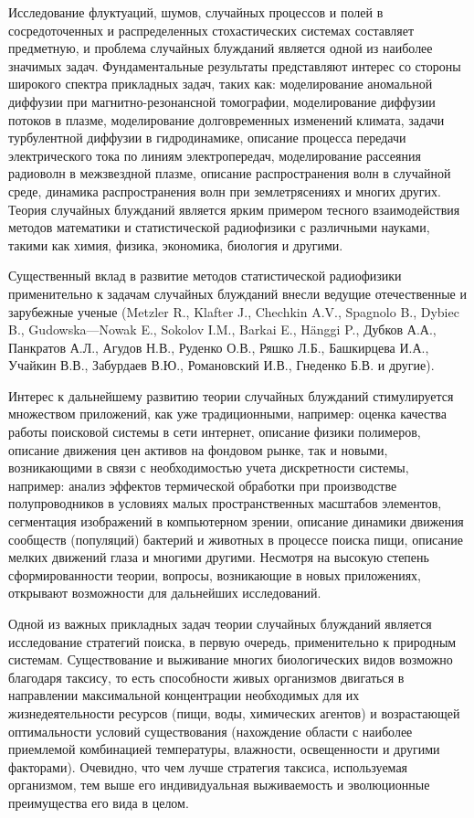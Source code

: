 
{\actuality} 

Исследование флуктуаций, шумов, случайных процессов и полей в сосредоточенных и распределенных стохастических системах составляет предметную, и проблема случайных блужданий является одной из наиболее значимых задач. Фундаментальные результаты представляют интерес со стороны широкого спектра прикладных задач, таких как: моделирование аномальной диффузии при магнитно-резонансной томографии, моделирование диффузии потоков в плазме, моделирование долговременных изменений климата, задачи турбулентной диффузии в гидродинамике, описание процесса передачи электрического тока по линиям электропередач, моделирование рассеяния радиоволн в межзвездной плазме, описание распространения волн в случайной среде, динамика распространения волн при землетрясениях и многих других. Теория случайных блужданий является ярким примером тесного взаимодействия методов математики и статистической радиофизики с различными науками, такими как химия, физика, экономика, биология и другими.

Существенный вклад в развитие методов статистической радиофизики применительно к задачам случайных блужданий внесли ведущие отечественные и зарубежные ученые (Metzler R., Klafter J., Chechkin A.V., Spagnolo B., Dybiec B., Gudowska—Nowak E., Sokolov I.M., Barkai E., Hänggi P., Дубков А.А., Панкратов А.Л., Агудов Н.В., Руденко О.В., Ряшко Л.Б., Башкирцева И.А., Учайкин В.В., Забурдаев В.Ю., Романовский И.В., Гнеденко Б.В. и другие).

Интерес к дальнейшему развитию теории случайных блужданий стимулируется множеством приложений, как уже традиционными, например: оценка качества работы поисковой системы в сети интернет, описание физики полимеров, описание движения цен активов на фондовом рынке, так и новыми, возникающими в связи с необходимостью учета дискретности системы, например: анализ эффектов термической обработки при производстве полупроводников в условиях малых пространственных масштабов элементов, сегментация изображений в компьютерном зрении, описание динамики движения сообществ (популяций) бактерий и животных в процессе поиска пищи, описание мелких движений глаза и многими другими. Несмотря на высокую степень сформированности теории, вопросы, возникающие в новых приложениях, открывают возможности для дальнейших исследований. 

Одной из важных прикладных задач теории случайных блужданий является исследование стратегий поиска, в первую очередь, применительно к природным системам. Существование и выживание многих биологических видов возможно благодаря таксису, то есть способности живых организмов двигаться в направлении максимальной концентрации необходимых для их жизнедеятельности ресурсов (пищи, воды, химических агентов) и возрастающей оптимальности условий существования (нахождение области с наиболее приемлемой комбинацией температуры, влажности, освещенности и другими факторами). Очевидно, что чем лучше стратегия таксиса, используемая организмом, тем выше его индивидуальная выживаемость и эволюционные преимущества его вида в целом.

